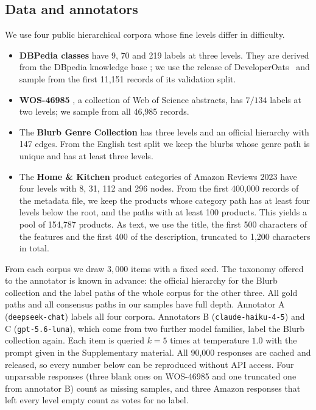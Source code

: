 \documentclass[preprint,12pt]{elsarticle}
\theoremstyle{definition}
\begin{document}
\subsection{Data and annotators}
\label{sec:setup-data}

We use four public hierarchical corpora whose fine levels differ in difficulty.
\begin{itemize}
    \item \textbf{DBPedia classes} have 9, 70 and 219 labels at three levels.
  They are derived from the DBpedia knowledge base \citep{lehmann2015dbpedia};
  we use the release of DeveloperOats~\cite{dbpediaclasses2022data} and sample from the first
  11,151 records of its validation split.
  \item \textbf{WOS-46985} \citep{kowsari2017hdltex,kowsari2018wosdata}, a collection of Web of
  Science abstracts, has $7/134$ labels at two levels; we sample from all
  46,985 records.
  \item The \textbf{Blurb Genre Collection} \citep{aly2019hierarchical,bgc2019data} has
  three levels and an official hierarchy with 147 edges. From the English test
  split we keep the blurbs whose genre path is unique and has at least three
  levels.
  \item The \textbf{Home \& Kitchen} product categories of Amazon Reviews 2023
  \citep{hou2026amazon,amazonreviews2023data} have four levels with 8, 31, 112 and 296 nodes. From the
  first 400,000 records of the metadata file, we keep the products whose
  category path has at least four levels below the root, and the paths with at
  least 100 products. This yields a pool of 154,787 products. As text, we use
  the title, the first 500 characters of the features and the first 400 of the
  description, truncated to 1,200 characters in total.
\end{itemize}
From each corpus we draw $3{,}000$ items with a fixed seed. The taxonomy
offered to the annotator is known in advance: the official hierarchy for the
Blurb collection and the label paths of the whole corpus for the other three.
All gold paths and all consensus paths in our samples have full depth. Annotator A
(\texttt{deepseek-chat}) labels all four corpora. Annotators B
(\texttt{claude-haiku-4-5}) and C (\texttt{gpt-5.6-luna}), which come from two
further model families, label the Blurb collection again. Each item is queried $k=5$ times at temperature $1.0$ with the prompt given in
the Supplementary material. All 90,000 responses are cached and released, so every number below can
be reproduced without API access. Four unparsable responses (three blank ones on
WOS-46985 and one truncated one from annotator B) count as missing samples, and
three Amazon responses that left every level empty count as votes for no label.
\end{document}
